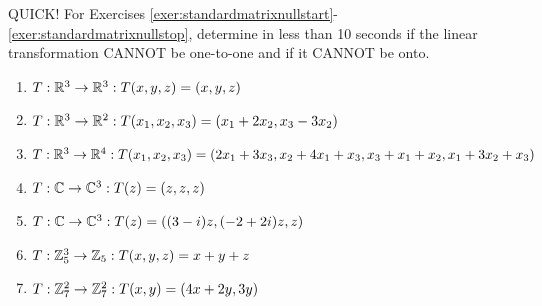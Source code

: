 \noindent QUICK! For Exercises \ref{exer:standardmatrixnullstart}-\ref{exer:standardmatrixnullstop}, determine in less than 10 seconds if the linear transformation CANNOT be one-to-one and if it CANNOT be onto. 
\begin{enumerate}[!HW!]
\item $T : \mathbb{R}^3\to \mathbb{R}^3 : T(x,y,z)=(x,y,z)$ %
\item $T: \mathbb{R}^3\to \mathbb{R}^2 : T(x_1,x_2,x_3)=(x_1+2x_2, x_3-3x_2)$ %
\item $T: \mathbb{R}^3\to \mathbb{R}^4 : T(x_1,x_2,x_3)=(2x_1+3x_3, x_2+4x_1+x_3, x_3+x_1+x_2, x_1+3x_2+x_3)$ %
\item $T: \mathbb{C} \to \mathbb{C}^3 : T(z) = (z,z,z)$%
\item $T:\mathbb{C}\to \mathbb{C}^3 : T(z) = ((3-i)z, (-2+2i)z, z)$ %
\item $T: \mathbb{Z}_5^3 \to \mathbb{Z}_5 : T(x,y,z) = x+y+z$%
\item $T: \mathbb{Z}_7^2\to \mathbb{Z}_7^2 : T(x,y)=(4x+2y, 3y)$ %
\end{enumerate}

